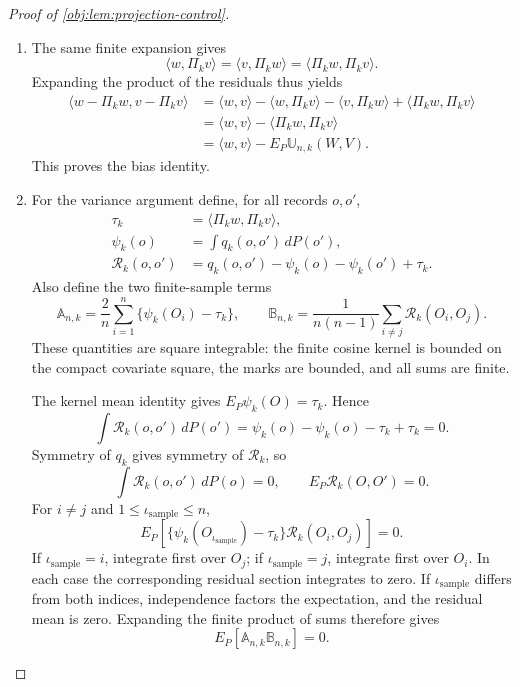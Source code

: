 \documentclass[11pt]{article}
\begin{document}
\begin{proof}[Proof of \cref{obj:lem:projection-control}]
\begin{enumerate}
\item The same finite expansion gives
\[
\langle w,\Pi_kv\rangle
=\langle v,\Pi_kw\rangle
=\langle\Pi_kw,\Pi_kv\rangle.
\]
Expanding the product of the residuals thus yields
\[
\begin{aligned}
\langle w-\Pi_kw,v-\Pi_kv\rangle
&=\langle w,v\rangle-\langle w,\Pi_kv\rangle
 -\langle v,\Pi_kw\rangle+\langle\Pi_kw,\Pi_kv\rangle\\
&=\langle w,v\rangle-\langle\Pi_kw,\Pi_kv\rangle\\
&=\langle w,v\rangle-E_P\mathbb U_{n,k}(W,V).
\end{aligned}
\]
This proves the bias identity.

\item For the variance argument define, for all records \(o,o'\),
\[
\begin{aligned}
\tau_k&=\langle\Pi_kw,\Pi_kv\rangle,\\
\psi_k(o)&=\int q_k(o,o')\,dP(o'),\\
\mathcal R_k(o,o')
&=q_k(o,o')-\psi_k(o)-\psi_k(o')+\tau_k.
\end{aligned}
\]
Also define the two finite-sample terms
\[
\mathbb A_{n,k}
=\frac2n\sum_{i=1}^n\{\psi_k(O_i)-\tau_k\},
\qquad
\mathbb B_{n,k}
=\frac1{n(n-1)}\sum_{i\ne j}\mathcal R_k(O_i,O_j).
\]
These quantities are square integrable: the finite cosine kernel is bounded on the compact covariate square, the marks are bounded, and all sums are finite.

The kernel mean identity gives \(E_P\psi_k(O)=\tau_k\). Hence
\[
\int\mathcal R_k(o,o')\,dP(o')
=\psi_k(o)-\psi_k(o)-\tau_k+\tau_k=0.
\]
Symmetry of \(q_k\) gives symmetry of \(\mathcal R_k\), so
\[
\int\mathcal R_k(o,o')\,dP(o)=0,
\qquad
E_P\mathcal R_k(O,O')=0.
\]
For \(i\ne j\) and \(1\le\iota_{\mathrm{sample}}\le n\),
\[
E_P\!\left[
 \{\psi_k(O_{\iota_{\mathrm{sample}}})-\tau_k\}\mathcal R_k(O_i,O_j)
\right]=0.
\]
If \(\iota_{\mathrm{sample}}=i\), integrate first over \(O_j\); if \(\iota_{\mathrm{sample}}=j\), integrate first over \(O_i\). In each case the corresponding residual section integrates to zero. If \(\iota_{\mathrm{sample}}\) differs from both indices, independence factors the expectation, and the residual mean is zero. Expanding the finite product of sums therefore gives
\[
E_P[\mathbb A_{n,k}\mathbb B_{n,k}]=0.
\]


\end{enumerate}
\end{proof}
\end{document}
